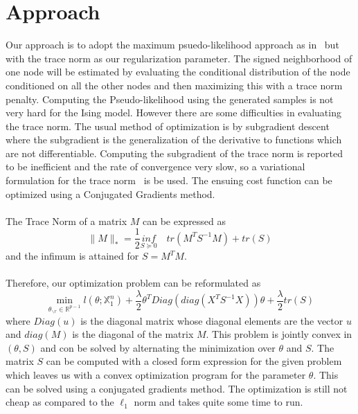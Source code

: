 \documentclass[11pt]{article}
\begin{document}
\section{Approach}

Our approach is to adopt the maximum psuedo-likelihood approach as in~\cite{ravikumar2010high} but with the trace norm as our regularization parameter. 
The signed neighborhood of one node will be estimated by evaluating the conditional distribution of the node conditioned on all the other nodes and then maximizing this with a trace norm penalty.
Computing the Pseudo-likelihood using the generated samples is not very hard for the Ising model. 
However there are some difficulties in evaluating the trace norm. 
The usual method of optimization is by subgradient descent where the subgradient is the generalization of the derivative to functions which are not differentiable. 
Computing the subgradient of the trace norm is reported to be inefficient and the rate of convergence very slow, so a variational formulation for the trace norm~\cite{grave2011trace} is be used. 
The ensuing cost function can be optimized using a Conjugated Gradients method.\\ \\
The Trace Norm of a matrix $M$ can be expressed as 
$$ \|M\|_* = \frac{1}{2} \underset{S \succeq 0}{inf} \quad  tr(M^T S^{-1} M) + tr(S)	 $$
and the infimum is attained for $S = M^T M$.\\ \\
Therefore, our optimization problem can be reformulated as
$$ \min_{\theta_{\backslash r} \in \mathbb{R}^{p-1}}  l(\theta; \mathbb{X}^n_1) + \frac{\lambda}{2} \theta^T Diag(diag(X^T S^{-1} X ))\theta + \frac{\lambda}{2} tr(S) $$ 
where $Diag(u)$ is the diagonal matrix whose diagonal elements are the vector $u$ and $diag(M)$ is the diagonal of the matrix $M$.
This problem is jointly convex in $(\theta, S)$ and con be solved by alternating the minimization over $\theta$ and $S$.
The matrix $S$ can be computed with a closed form expression for the given problem which leaves us with a convex optimization program for the parameter $\theta$.
This can be solved using a conjugated gradients method. The optimization is still not cheap as compared to the $\ell_1$ norm and takes quite some time to run. 

\end{document}
